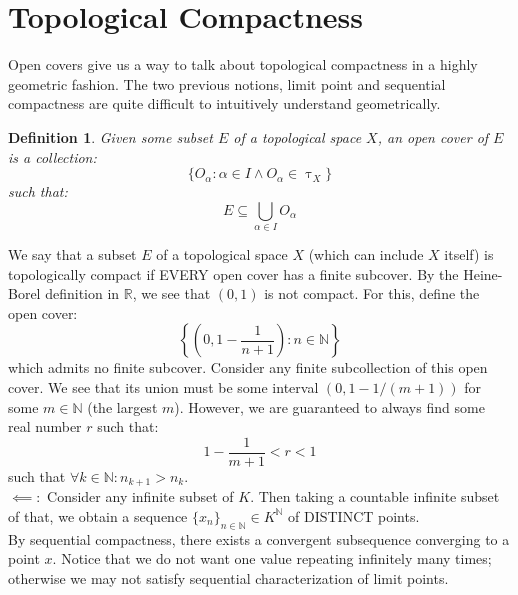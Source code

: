 \documentclass[10pt,letterpaper]{article} %
\newtheorem{defn}{Definition}[section]
\begin{document}
\pagebreak
\section{Topological Compactness}
Open covers give us a way to talk about topological compactness in a highly geometric fashion. The two previous notions, limit point and sequential compactness are quite difficult to intuitively understand geometrically.
\begin{defn}
Given some subset $E$ of a topological space $X$, an open cover of $E$ is a collection:
\begin{equation*}
\{O_\alpha: \alpha \in I \land O_\alpha \in \uptau_X\}
\end{equation*}
such that:
\begin{equation*}
E \subseteq \bigcup_{\alpha \in I} O_\alpha
\end{equation*}
\end{defn}
We say that a subset $E$ of a topological space $X$ (which can include $X$ itself) is topologically compact if EVERY open cover has a finite subcover. By the Heine-Borel definition in $\mathbb{R}$, we see that $(0, 1)$ is not compact. For this, define the open cover:
\begin{equation*}
\left\{\left(0, 1-\frac{1}{n+1}\right) : n \in \mathbb{N}\right\}
\end{equation*}
which admits no finite subcover. Consider any finite subcollection of this open cover. We see that its union must be some interval $(0, 1-1/(m+1))$ for some $m \in \mathbb{N}$ (the largest $m$). However, we are guaranteed to always find some real number $r$ such that:
\begin{equation*}
1 - \frac{1}{m+1} < r < 1
\end{equation*}
such that $\forall k \in \mathbb{N}: n_{k+1} > n_k$.\\

$\impliedby:$ Consider any infinite subset of $K$. Then taking a countable infinite subset of that, we obtain a sequence $\{x_n\}_{n \in \mathbb{N}} \in K^\mathbb{N}$ of DISTINCT points.\\

By sequential compactness, there exists a convergent subsequence converging to a point $x$. Notice that we do not want one value repeating infinitely many times; otherwise we may not satisfy sequential characterization of limit points.\\
\end{document}
